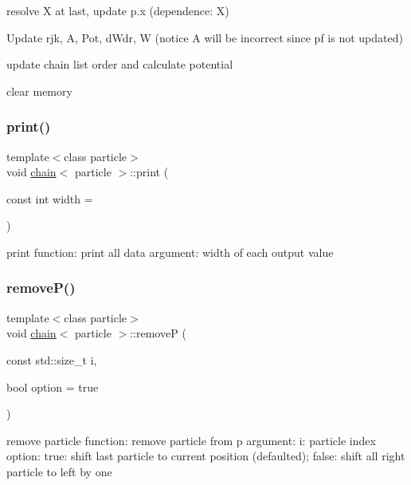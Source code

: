 resolve X at last, update p.\+x (dependence\+: X)

Update rjk, A, Pot, d\+Wdr, W (notice A will be incorrect since pf is not updated)

update chain list order and calculate potential

clear memory \hypertarget{classchain_a573ade699785fd4f3d5433aaed7381d0}{}\label{classchain_a573ade699785fd4f3d5433aaed7381d0} 
\subsubsection{\texorpdfstring{print()}{print()}}
{\footnotesize\ttfamily template$<$class particle$>$ \\
void \hyperlink{classchain}{chain}$<$ particle $>$\+::print (\begin{DoxyParamCaption}\item[{const int}]{width = {} }\end{DoxyParamCaption})\hspace{0.3cm}{\ttfamily [inline]}}



print function\+: print all data argument\+: width of each output value 

\hypertarget{classchain_afcf23f66ae1f2a8a20787c9767d01a99}{}\label{classchain_afcf23f66ae1f2a8a20787c9767d01a99} 
\subsubsection{\texorpdfstring{remove\+P()}{removeP()}}
{\footnotesize\ttfamily template$<$class particle$>$ \\
void \hyperlink{classchain}{chain}$<$ particle $>$\+::removeP (\begin{DoxyParamCaption}\item[{const std\+::size\+\_\+t}]{i,  }\item[{bool}]{option = {\ttfamily true} }\end{DoxyParamCaption})\hspace{0.3cm}{\ttfamily [inline]}}



remove particle function\+: remove particle from p argument\+: i\+: particle index option\+: true\+: shift last particle to current position (defaulted); false\+: shift all right particle to left by one 

